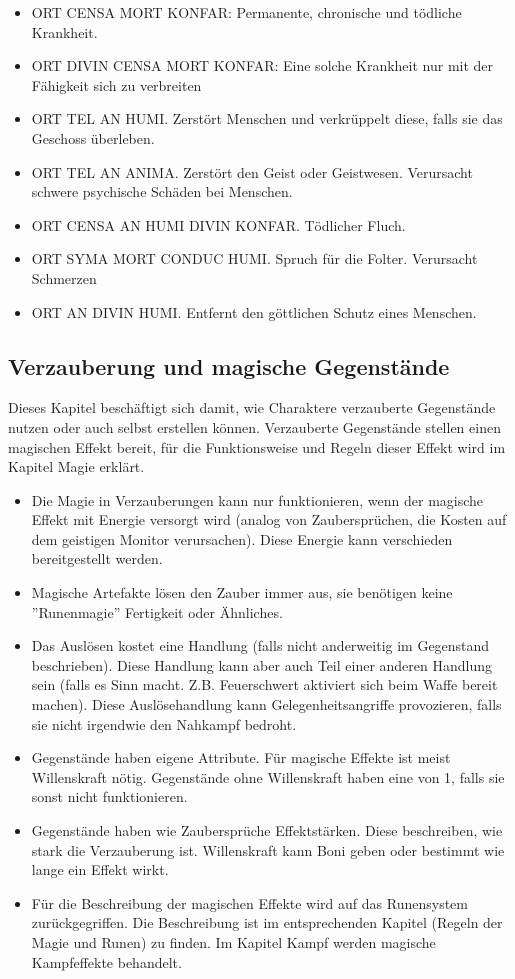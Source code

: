 \documentclass{article}
\begin{document}
\begin{itemize}
\item ORT CENSA MORT KONFAR: Permanente, chronische und tödliche Krankheit.
\item ORT DIVIN CENSA MORT KONFAR: Eine solche Krankheit nur mit der Fähigkeit sich zu verbreiten
\item ORT TEL AN HUMI. Zerstört Menschen und verkrüppelt diese, falls sie das Geschoss überleben.
\item ORT TEL AN ANIMA. Zerstört den Geist oder Geistwesen. Verursacht schwere psychische Schäden bei Menschen.
\item ORT CENSA AN HUMI DIVIN KONFAR. Tödlicher Fluch.
\item ORT SYMA MORT CONDUC HUMI. Spruch für die Folter. Verursacht Schmerzen
\item ORT AN DIVIN HUMI. Entfernt den göttlichen Schutz eines Menschen.
\end{itemize}

\begin{center}
\section{Verzauberung und magische Gegenstände}
\end{center}

Dieses Kapitel beschäftigt sich damit, wie Charaktere verzauberte Gegenstände nutzen oder auch selbst erstellen können.
Verzauberte Gegenstände stellen einen magischen Effekt bereit, für die Funktionsweise und Regeln dieser Effekt wird im
Kapitel Magie erklärt.

\begin{itemize}
\item Die Magie in Verzauberungen kann nur funktionieren, wenn der magische Effekt mit Energie versorgt wird (analog von Zaubersprüchen, die Kosten auf dem geistigen Monitor verursachen). Diese Energie kann verschieden bereitgestellt werden.
\item Magische Artefakte lösen den Zauber immer aus, sie benötigen keine ''Runenmagie'' Fertigkeit oder Ähnliches.
\item Das Auslösen kostet eine Handlung (falls nicht anderweitig im Gegenstand beschrieben). Diese Handlung kann aber auch Teil einer anderen Handlung sein (falls es Sinn macht. Z.B. Feuerschwert aktiviert sich beim Waffe bereit machen). Diese Auslösehandlung kann Gelegenheitsangriffe provozieren, falls sie nicht irgendwie den Nahkampf bedroht.
\item Gegenstände haben eigene Attribute. Für magische Effekte ist meist Willenskraft nötig. Gegenstände ohne Willenskraft haben eine von 1, falls sie sonst nicht funktionieren.
\item Gegenstände haben wie Zaubersprüche Effektstärken. Diese beschreiben, wie stark die Verzauberung ist. Willenskraft kann Boni geben oder bestimmt wie lange ein Effekt wirkt.
\item Für die Beschreibung der magischen Effekte wird auf das Runensystem zurückgegriffen. Die Beschreibung ist im entsprechenden Kapitel (Regeln der Magie und Runen) zu finden. Im Kapitel Kampf werden magische Kampfeffekte behandelt.
\end{itemize}
\end{document}
